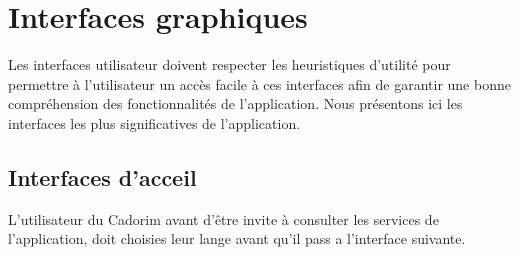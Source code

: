 \section{Interfaces graphiques}
Les interfaces utilisateur doivent respecter les heuristiques d'utilité pour permettre à l'utilisateur un accès facile à ces interfaces afin de garantir une bonne compréhension des fonctionnalités de l'application. Nous présentons ici les interfaces les plus significatives de l'application.
\subsection{Interfaces d'acceil}

L'utilisateur du Cadorim avant d'être invite à consulter les services de l'application, doit 
choisies leur lange avant qu'il pass a l'interface suivante.

